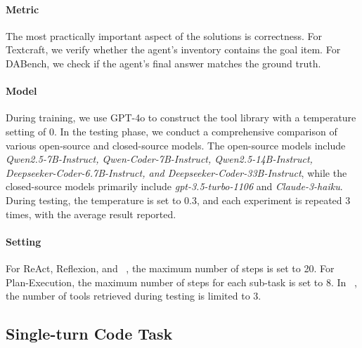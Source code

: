 \paragraph{Metric} 
The most practically important aspect of the solutions is correctness. For Textcraft, we verify whether the agent’s inventory contains the goal item. For DABench, we check if the agent’s final answer matches the ground truth.

\paragraph{Model}
During training, we use GPT-4o to construct the tool library with a temperature setting of 0. In the testing phase, we conduct a comprehensive comparison of various open-source and closed-source models. The open-source models include \textit{Qwen2.5-7B-Instruct, Qwen-Coder-7B-Instruct, Qwen2.5-14B-Instruct, Deepseeker-Coder-6.7B-Instruct, and Deepseeker-Coder-33B-Instruct}, while the closed-source models primarily include \textit{gpt-3.5-turbo-1106} and \textit{Claude-3-haiku}. During testing, the temperature is set to 0.3, and each experiment is repeated 3 times, with the average result reported.

\paragraph{Setting} 
For ReAct, Reflexion, and \ours\ , the maximum number of steps is set to 20. For Plan-Execution, the maximum number of steps for each sub-task is set to 8. In \ours\ , the number of tools retrieved during testing is limited to 3.



\subsection{Single-turn Code Task}
\label{subsec:code}
